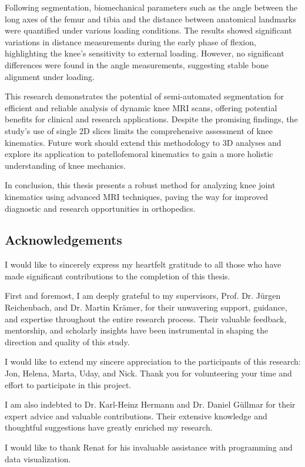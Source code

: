 \documentclass{micro-econ-thesis}
\begin{document}
Following segmentation, biomechanical parameters such as the angle between the long axes of the femur and tibia and the distance between anatomical landmarks were quantified under various loading conditions. The results showed significant variations in distance measurements during the early phase of flexion, highlighting the knee's sensitivity to external loading. However, no significant differences were found in the angle measurements, suggesting stable bone alignment under loading.

This research demonstrates the potential of semi-automated segmentation for efficient and reliable analysis of dynamic knee MRI scans, offering potential benefits for clinical and research applications. Despite the promising findings, the study's use of single 2D slices limits the comprehensive assessment of knee kinematics. Future work should extend this methodology to 3D analyses and explore its application to patellofemoral kinematics to gain a more holistic understanding of knee mechanics.

In conclusion, this thesis presents a robust method for analyzing knee joint kinematics using advanced MRI techniques, paving the way for improved diagnostic and research opportunities in orthopedics.

\clearpage
\subsection*{Acknowledgements}
I would like to sincerely express my heartfelt gratitude to all those who have made significant contributions to the completion of this thesis.

First and foremost, I am deeply grateful to my supervisors, Prof. Dr. Jürgen Reichenbach, and Dr. Martin Krämer, for their unwavering support, guidance, and expertise throughout the entire research process. Their valuable feedback, mentorship, and scholarly insights have been instrumental in shaping the direction and quality of this study.


I would like to extend my sincere appreciation to the participants of this research: Jon, Helena, Marta, Uday, and Nick. Thank you for volunteering your time and effort to participate in this project.
 
 
I am also indebted to Dr. Karl-Heinz Hermann and Dr. Daniel Güllmar for their expert advice and valuable contributions. Their extensive knowledge and thoughtful suggestions have greatly enriched my research.

I would like to thank Renat for his invaluable assistance with programming and data visualization. 
\end{document}
